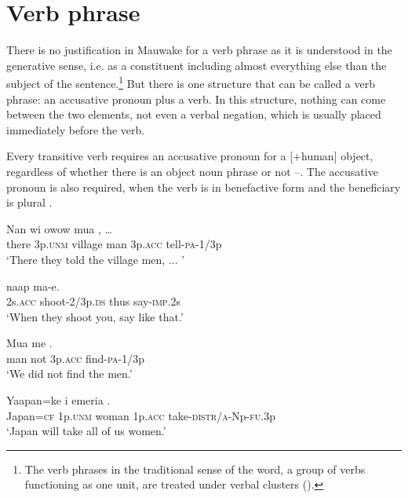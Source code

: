 \section{Verb phrase} \label{sec:4.5}
{}
There is no justification in Mauwake for a verb phrase as it is understood in the generative sense, i.e. as a constituent including almost everything else than the subject of the sentence.\footnote{The verb phrases in the traditional sense of the word, a group of verbs functioning as one unit, are treated under verbal clusters ().}  But there is one structure that can be called a verb phrase: an accusative pronoun plus a verb.  In this structure, nothing can come between the two elements, not even a verbal negation, which is usually placed immediately before the verb.

Every transitive verb requires an accusative pronoun for a [+human] object, regardless of whether there is an object noun phrase or not --. The accusative pronoun is also required, when the verb is in benefactive form and the beneficiary is plural . 

\ea%
\label{ex:4:x848}
\gll Nan  wi  owow  mua   ,  {\dots} \\
  there  3p.\textsc{unm}  village  man  3p.\textsc{acc}  tell-\textsc{pa}-1/3p    \\
\glt`There they told the village men, ... '
\z

\ea%
\label{ex:4:x852}
\gll {}   naap  ma-e. \\
    2s.\textsc{acc}  shoot-2/3p.\textsc{ds}  thus  say-\textsc{imp}.2s  \\
\glt`When they shoot you, say like that.'
\z

\ea%
\label{ex:4:x849}
\gll Mua  me   . \\
   man  not  3p.\textsc{acc}  find-\textsc{pa}-1/3p   \\
\glt`We did not find the men.'
\z

\ea%
\label{ex:4:x850}
\gll Yaapan=ke  i  emeria   . \\
   Japan=\textsc{cf}  1p.\textsc{unm}  woman  1p.\textsc{acc}  take-\textsc{distr}/\textsc{a}-Np-\textsc{fu}.3p   \\
\glt`Japan will take all of us women.'
\z

